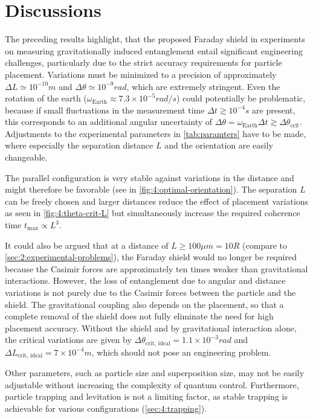 \section{Discussions}\label{sec:4:discussion}
The preceding results highlight, that the proposed Faraday shield in experiments on measuring gravitationally induced entanglement entail significant engineering challenges, particularly due to the strict accuracy requirements for particle placement.
Variations must be minimized to a precision of approximately $\Delta L \simeq 10^{-10}\si{m}$ and $\Delta \theta \simeq 10^{-9}\si{rad}$, which are extremely stringent.
Even the rotation of the earth ($\omega_\mathrm{Earth}\approx 7.3\times 10^{-5}\si{rad/s}$) could potentially be problematic, because if small fluctuations in the measurement time $\Delta t \gtrsim 10^{-4}\si{s}$ are present, this corresponds to an additional angular uncertainty of $\Delta \theta = \omega_\mathrm{Earth}\Delta t \gtrsim \Delta \theta_\mathrm{crit}$.
Adjustments to the experimental parameters in \cref{tab:paramters} have to be made, where especially the separation distance $L$ and the orientation are easily changeable.

The parallel configuration is very stable against variations in the distance and might therefore be favorable (see in \cref{fig:4:optimal-orientation}).
The separation $L$ can be freely chosen and larger distances reduce the effect of placement variations as seen in \cref{fig:4:theta-crit-L} but simultaneously increase the required coherence time $t_\mathrm{max} \propto L^3$.

It could also be argued that at a distance of $L \geq 100\si{\mu m} = 10 R$ (compare to \cref{sec:2:experimental-problems}), the Faraday shield would no longer be required because the Casimir forces are approximately ten times weaker than gravitational interactions.
However, the loss of entanglement due to angular and distance variations is not purely due to the Casimir forces between the particle and the shield.
The gravitational coupling also depends on the placement, so that a complete removal of the shield does not fully eliminate the need for high placement accuracy.
Without the shield and by gravitational interaction alone, the critical variations are given by $\Delta \theta_\mathrm{crit,\,ideal} = 1.1 \times 10^{-3}\si{rad}$ and $\Delta L_\mathrm{crit,\,ideal} = 7\times 10^{-4}\si{m}$, which should not pose an engineering problem.

Other parameters, such as particle size and superposition size, may not be easily adjustable without increasing the complexity of quantum control.
Furthermore, particle trapping and levitation is not a limiting factor, as stable trapping is achievable for various configurations (\cref{sec:4:trapping}).

